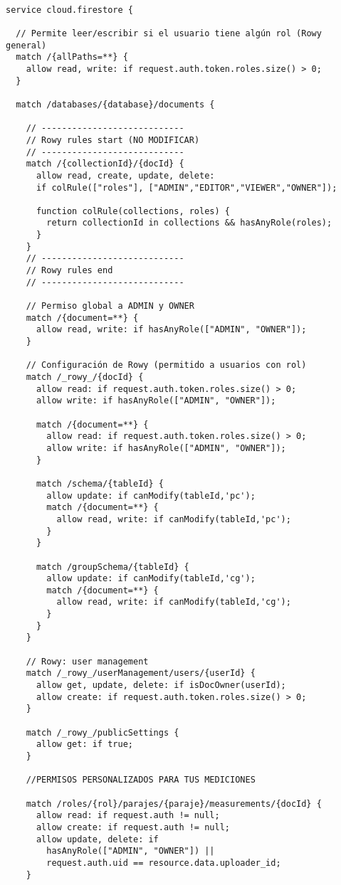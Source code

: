 \begin{verbatim}

service cloud.firestore {
  
  // Permite leer/escribir si el usuario tiene algún rol (Rowy general)
  match /{allPaths=**} {
    allow read, write: if request.auth.token.roles.size() > 0;
  }

  match /databases/{database}/documents {

    // ----------------------------
    // Rowy rules start (NO MODIFICAR)
    // ----------------------------
    match /{collectionId}/{docId} {
      allow read, create, update, delete: 
      if colRule(["roles"], ["ADMIN","EDITOR","VIEWER","OWNER"]);
      
      function colRule(collections, roles) {
        return collectionId in collections && hasAnyRole(roles);
      }
    }
    // ----------------------------
    // Rowy rules end
    // ----------------------------

    // Permiso global a ADMIN y OWNER
    match /{document=**} {
      allow read, write: if hasAnyRole(["ADMIN", "OWNER"]);
    }

    // Configuración de Rowy (permitido a usuarios con rol)
    match /_rowy_/{docId} {
      allow read: if request.auth.token.roles.size() > 0;
      allow write: if hasAnyRole(["ADMIN", "OWNER"]);

      match /{document=**} {
        allow read: if request.auth.token.roles.size() > 0;
        allow write: if hasAnyRole(["ADMIN", "OWNER"]);
      }

      match /schema/{tableId} {
        allow update: if canModify(tableId,'pc');
        match /{document=**} {
          allow read, write: if canModify(tableId,'pc');
        }
      }

      match /groupSchema/{tableId} {
        allow update: if canModify(tableId,'cg');
        match /{document=**} {
          allow read, write: if canModify(tableId,'cg');
        }
      }
    }

    // Rowy: user management
    match /_rowy_/userManagement/users/{userId} {
      allow get, update, delete: if isDocOwner(userId);
      allow create: if request.auth.token.roles.size() > 0;
    }

    match /_rowy_/publicSettings {
      allow get: if true;
    }

    //PERMISOS PERSONALIZADOS PARA TUS MEDICIONES

    match /roles/{rol}/parajes/{paraje}/measurements/{docId} {
      allow read: if request.auth != null;
      allow create: if request.auth != null;
      allow update, delete: if 
        hasAnyRole(["ADMIN", "OWNER"]) || 
        request.auth.uid == resource.data.uploader_id;
    }


\end{verbatim}
